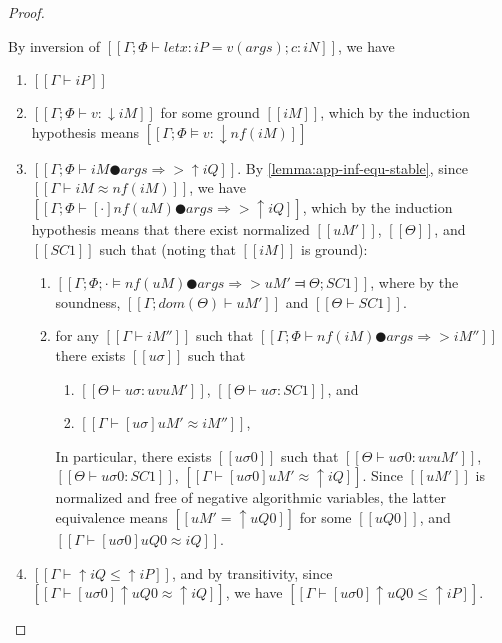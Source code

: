 \begin{proof}
\begin{caseof}
            By inversion of 
            $[[Γ ; Φ ⊢ let x:iP = v(args); c : iN]]$,
            we have
            \begin{enumerate}
                \item $[[Γ ⊢ iP]]$
                \item $[[Γ ; Φ ⊢ v : ↓iM]]$ for some ground $[[iM]]$,
                    which by the induction hypothesis means
                    $[[Γ ; Φ ⊨ v : ↓nf(iM)]]$
                \item $[[Γ ; Φ ⊢ iM ● args ⇒> ↑iQ]]$. 
                    By \cref{lemma:app-inf-equ-stable}, since
                    $[[Γ ⊢ iM ≈ nf(iM)]]$, we have
                    $[[Γ ; Φ ⊢ [·]nf(uM) ● args ⇒> ↑iQ]]$, 
                    which by the induction hypothesis means 
                    that there exist normalized 
                    $[[uM']]$, $[[Θ]]$, and $[[SC1]]$ such that
                    (noting that $[[iM]]$ is ground):
                    \begin{enumerate}
                        \item $[[ Γ; Φ; · ⊨ nf(uM) ● args ⇒> uM' ⫤ Θ; SC1 ]]$,
                            where by the soundness, $[[Γ; dom(Θ) ⊢ uM']]$ and $[[Θ ⊢ SC1]]$.
                        \item for any $[[Γ ⊢ iM'']]$ 
                            such that $[[Γ; Φ ⊢ nf(iM) ● args ⇒> iM'']]$
                            there exists $[[uσ]]$ such that 
                            \begin{enumerate}
                                \item $[[ Θ ⊢ uσ : uv uM' ]]$, $[[ Θ ⊢ uσ : SC1 ]]$, and 
                                \item $[[Γ ⊢ [uσ]uM' ≈ iM'']]$,
                            \end{enumerate}
                            In particular, there exists
                            $[[uσ0]]$
                            such that 
                            $[[ Θ ⊢ uσ0 : uv uM']]$,
                            $[[ Θ ⊢ uσ0 : SC1]]$,
                            $[[Γ ⊢ [uσ0]uM' ≈ ↑iQ]]$.
                            Since $[[uM']]$ is normalized and free of negative algorithmic variables,
                            the latter equivalence means
                            $[[uM' = ↑uQ0]]$ for some $[[uQ0]]$, and $[[Γ ⊢ [uσ0]uQ0 ≈ iQ]]$.
                    \end{enumerate}
                \item $[[Γ ⊢ ↑iQ ≤ ↑iP]]$,
                    and by transitivity, since $[[Γ ⊢ [uσ0]↑uQ0 ≈ ↑iQ]]$,
                    we have $[[Γ ⊢ [uσ0]↑uQ0 ≤ ↑iP]]$.
                    

\end{enumerate}
\end{caseof}
\end{proof}
